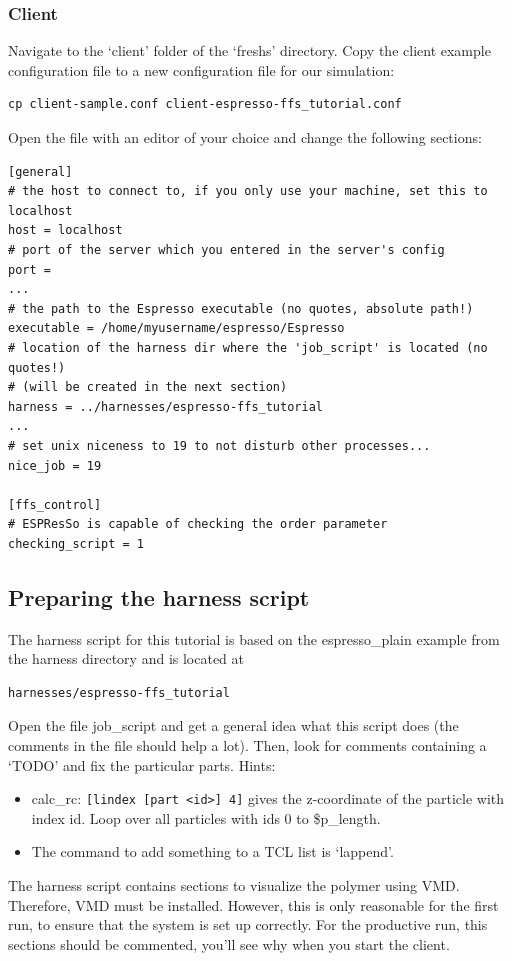 \documentclass[a4paper,oneside]{article}
\newenvironment{mylisting}
{\begin{list}{}{\setlength{\leftmargin}{1em}}\item\scriptsize\bfseries}
{\end{list}}
\begin{document}
\subsubsection{Client}
Navigate to the `client' folder of the `freshs' directory. Copy the client example configuration file to a new configuration file for our simulation:
\begin{mylisting}
\begin{verbatim}
cp client-sample.conf client-espresso-ffs_tutorial.conf
\end{verbatim}
\end{mylisting}
Open the file with an editor of your choice and change the following sections:
\begin{mylisting}
\begin{verbatim}
[general]
# the host to connect to, if you only use your machine, set this to localhost
host = localhost
# port of the server which you entered in the server's config
port = 
...
# the path to the Espresso executable (no quotes, absolute path!)
executable = /home/myusername/espresso/Espresso
# location of the harness dir where the 'job_script' is located (no quotes!)
# (will be created in the next section)
harness = ../harnesses/espresso-ffs_tutorial
...
# set unix niceness to 19 to not disturb other processes...
nice_job = 19

[ffs_control]
# ESPResSo is capable of checking the order parameter
checking_script = 1
\end{verbatim}
\end{mylisting}


\subsection{Preparing the harness script}
The harness script for this tutorial is based on the espresso\_plain example from the harness directory and is located at
\begin{mylisting}
\begin{verbatim}
harnesses/espresso-ffs_tutorial
\end{verbatim}
\end{mylisting}
Open the file job\_script and get a general idea what this script does (the comments in the file should help a lot). Then, look for comments containing a `TODO' and fix the particular parts. Hints:
\begin{itemize}
 \item calc\_rc: \verb+[lindex [part <id>] 4]+
gives the z-coordinate of the particle with index id. Loop over all particles with ids 0 to \$p\_length.
 \item The command to add something to a TCL list is `lappend'.
\end{itemize}
The harness script contains sections to visualize the polymer using VMD. Therefore, VMD must be installed. However, this is only reasonable for the first run, to ensure that the system is set up correctly. For the productive run, this sections should be commented, you'll see why when you start the client.
\end{document}
